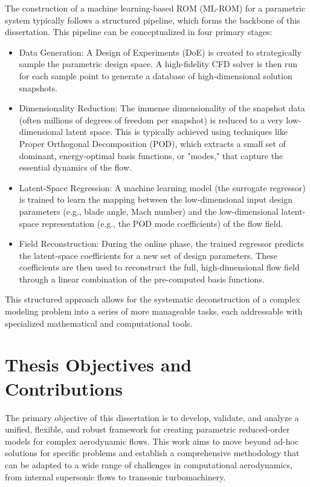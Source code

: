 The construction of a machine learning-based ROM (ML-ROM) for a parametric system typically follows a structured pipeline, which forms the backbone of this dissertation. This pipeline can be conceptualized in four primary stages:

\begin{itemize}
    \item Data Generation: A Design of Experiments (DoE) is created to strategically sample the parametric design space. A high-fidelity CFD solver is then run for each sample point to generate a database of high-dimensional solution snapshots.
    
    \item Dimensionality Reduction: The immense dimensionality of the snapshot data (often millions of degrees of freedom per snapshot) is reduced to a very low-dimensional latent space. This is typically achieved using techniques like Proper Orthogonal Decomposition (POD), which extracts a small set of dominant, energy-optimal basis functions, or "modes," that capture the essential dynamics of the flow.

    \item Latent-Space Regression: A machine learning model (the surrogate regressor) is trained to learn the mapping between the low-dimensional input design parameters (e.g., blade angle, Mach number) and the low-dimensional latent-space representation (e.g., the POD mode coefficients) of the flow field.

    \item Field Reconstruction: During the online phase, the trained regressor predicts the latent-space coefficients for a new set of design parameters. These coefficients are then used to reconstruct the full, high-dimensional flow field through a linear combination of the pre-computed basis functions.
\end{itemize}

This structured approach allows for the systematic deconstruction of a complex modeling problem into a series of more manageable tasks, each addressable with specialized mathematical and computational tools.

\section{Thesis Objectives and Contributions}

The primary objective of this dissertation is to develop, validate, and analyze a unified, flexible, and robust framework for creating parametric reduced-order models for complex aerodynamic flows. This work aims to move beyond ad-hoc solutions for specific problems and establish a comprehensive methodology that can be adapted to a wide range of challenges in computational aerodynamics, from internal supersonic flows to transonic turbomachinery.


